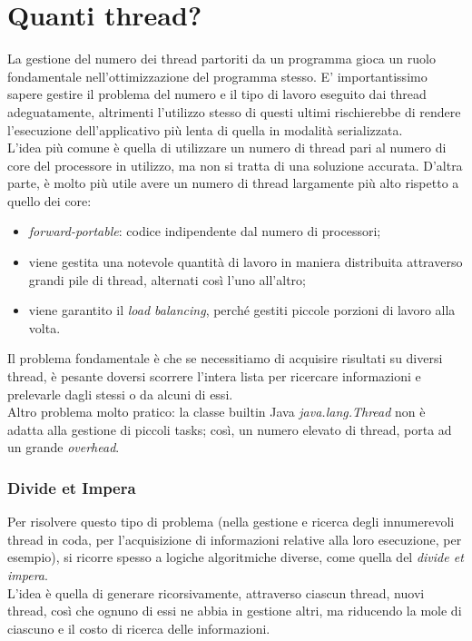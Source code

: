 \section{Quanti thread?}
La gestione del numero dei thread partoriti da un programma gioca un ruolo fondamentale nell'ottimizzazione del programma stesso. E' importantissimo sapere gestire il problema del numero e il tipo di lavoro eseguito dai thread adeguatamente, altrimenti l'utilizzo stesso di questi ultimi rischierebbe di rendere l'esecuzione dell'applicativo più lenta di quella in modalità serializzata. \\
L'idea più comune è quella di utilizzare un numero di thread pari al numero di core del processore in utilizzo, ma non si tratta di una soluzione accurata. D'altra parte, è molto più utile avere un numero di thread largamente più alto rispetto a quello dei core:
\begin{itemize}
	\item \textit{forward-portable}: codice indipendente dal numero di processori;
	\item viene gestita una notevole quantità di lavoro in maniera distribuita attraverso grandi pile di thread, alternati così l'uno all'altro;
	\item viene garantito il \textit{load balancing}, perché gestiti piccole porzioni di lavoro alla volta.
\end{itemize}
Il problema fondamentale è che se necessitiamo di acquisire risultati su diversi thread, è pesante doversi scorrere l'intera lista per ricercare informazioni e prelevarle dagli stessi o da alcuni di essi. \\
Altro problema molto pratico: la classe builtin Java \textit{java.lang.Thread} non è adatta alla gestione di piccoli tasks; così, un numero elevato di thread, porta ad un grande \textit{overhead}.

\subsubsection{Divide et Impera}
Per risolvere questo tipo di problema (nella gestione e ricerca degli innumerevoli thread in coda, per l'acquisizione di informazioni relative alla loro esecuzione, per esempio), si ricorre spesso a logiche algoritmiche diverse, come quella del \textit{divide et impera}. \\
L'idea è quella di generare ricorsivamente, attraverso ciascun thread, nuovi thread, così che ognuno di essi ne abbia in gestione altri, ma riducendo la mole di ciascuno e il costo di ricerca delle informazioni.

